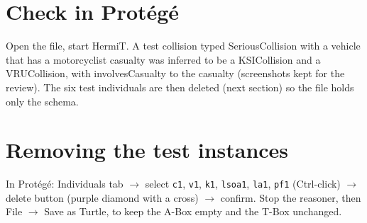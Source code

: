 \documentclass[10.5pt,a4paper]{article}
\begin{document}
\section{Check in Protégé}
Open the file, start HermiT. A test collision typed SeriousCollision with a vehicle that has a motorcyclist casualty was inferred to be a KSICollision and a VRUCollision, with involvesCasualty to the casualty (screenshots kept for the review). The six test individuals are then deleted (next section) so the file holds only the schema.

\section{Removing the test instances}
In Protégé: Individuals tab $\rightarrow$ select \texttt{c1}, \texttt{v1}, \texttt{k1}, \texttt{lsoa1}, \texttt{la1}, \texttt{pf1} (Ctrl-click) $\rightarrow$ delete button (purple diamond with a cross) $\rightarrow$ confirm. Stop the reasoner, then File $\rightarrow$ Save as Turtle, to keep the A-Box empty and the T-Box unchanged.
\end{document}
